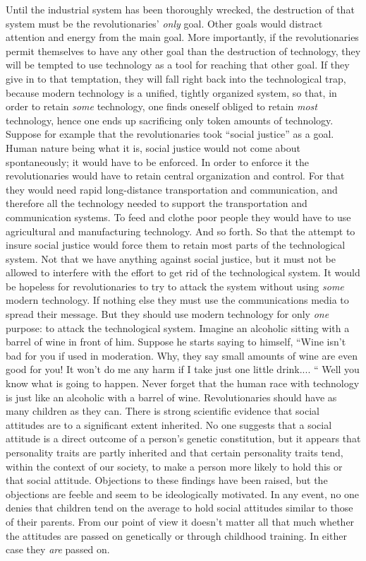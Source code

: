  Until the industrial system has been thoroughly wrecked, the destruction of that system must be the revolutionaries’ {\em only} goal. Other goals would distract attention and energy from the main goal. More importantly, if the revolutionaries permit themselves to have any other goal than the destruction of technology, they will be tempted to use technology as a tool for reaching that other goal. If they give in to that temptation, they will fall right back into the technological trap, because modern technology is a unified, tightly organized system, so that, in order to retain {\em some} technology, one finds oneself obliged to retain {\em most} technology, hence one ends up sacrificing only token amounts of technology.
 Suppose for example that the revolutionaries took “social justice” as a goal. Human nature being what it is, social justice would not come about spontaneously; it would have to be enforced. In order to enforce it the revolutionaries would have to retain central organization and control. For that they would need rapid long-distance transportation and communication, and therefore all the technology needed to support the transportation and communication systems. To feed and clothe poor people they would have to use agricultural and manufacturing technology. And so forth. So that the attempt to insure social justice would force them to retain most parts of the technological system. Not that we have anything against social justice, but it must not be allowed to interfere with the effort to get rid of the technological system.
 It would be hopeless for revolutionaries to try to attack the system without using {\em some} modern technology. If nothing else they must use the communications media to spread their message. But they should use modern technology for only {\em one} purpose: to attack the technological system.
 Imagine an alcoholic sitting with a barrel of wine in front of him. Suppose he starts saying to himself, “Wine isn’t bad for you if used in moderation. Why, they say small amounts of wine are even good for you! It won’t do me any harm if I take just one little drink.... “ Well you know what is going to happen. Never forget that the human race with technology is just like an alcoholic with a barrel of wine.
 Revolutionaries should have as many children as they can. There is strong scientific evidence that social attitudes are to a significant extent inherited. No one suggests that a social attitude is a direct outcome of a person’s genetic constitution, but it appears that personality traits are partly inherited and that certain personality traits tend, within the context of our society, to make a person more likely to hold this or that social attitude. Objections to these findings have been raised, but the objections are feeble and seem to be ideologically motivated. In any event, no one denies that children tend on the average to hold social attitudes similar to those of their parents. From our point of view it doesn’t matter all that much whether the attitudes are passed on genetically or through childhood training. In either case they {\em are} passed on.
